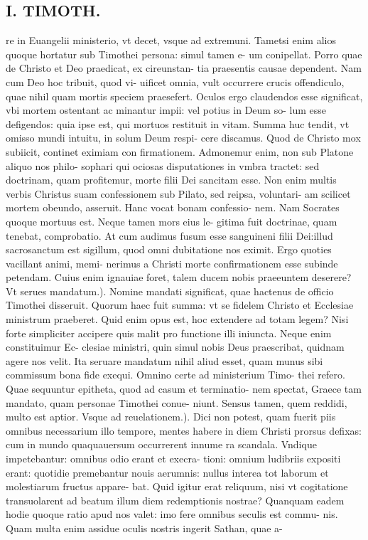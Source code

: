 \documentclass{article}
\begin{document}
\begin{pages}
\section*{I. TIMOTH. }
\marginpar{[ p.80 ]}\pstart re in Euangelii ministerio, vt decet, vsque ad extremuni. Tametsi enim alios quoque hortatur sub Timothei persona: simul tamen e- um conipellat. Porro quae de Christo et Deo praedicat, ex cireunstan- tia praesentis causae dependent. Nam cum Deo hoc tribuit, quod vi- uificet omnia, vult occurrere crucis offendiculo, quae nihil quam mortis speciem praesefert. Oculos ergo claudendos esse significat, vbi mortem ostentant ac minantur impii: vel potius in Deum so- lum esse defigendos: quia ipse est, qui mortuos restituit in vitam. Summa huc tendit, vt omisso mundi intuitu, in solum Deum respi- cere discamus. Quod de Christo mox subiicit, continet eximiam con firmationem. Admonemur enim, non sub Platone aliquo nos philo- sophari qui ociosas disputationes in vmbra tractet: sed doctrinam, quam profitemur, morte filii Dei sancitam esse. Non enim multis verbis Christus suam confessionem sub Pilato, sed reipsa, voluntari- am scilicet mortem obeundo, asseruit. Hanc vocat bonam confessio- nem. Nam Socrates quoque mortuus est. Neque tamen mors eius le- gitima fuit doctrinae, quam tenebat, comprobatio. At cum audimus fusum esse sanguineni filii Dei:illud sacrosanctum est sigillum, quod omni dubitatione nos eximit. Ergo quoties vacillant animi, memi- nerimus a Christi morte confirmationem esse subinde petendam. Cuius enim ignauiae foret, talem ducem nobis praeeuntem deserere?  \pend\pstart Vt serues mandatum.). Nomine mandati significat, quae hactenus de officio Timothei disseruit. Quorum haec fuit summa: vt se fidelem Christo et Ecclesiae ministrum praeberet. Quid enim opus est, hoc extendere ad totam legem? Nisi forte simpliciter accipere quis malit pro functione illi iniuncta. Neque enim constituimur Ec- clesiae ministri, quin simul nobis Deus praescribat, quidnam agere nos velit. Ita seruare mandatum nihil aliud esset, quam munus sibi commissum bona fide exequi. Omnino certe ad ministerium Timo- thei refero. Quae sequuntur epitheta, quod ad casum et terminatio- nem spectat, Graece tam mandato, quam personae Timothei conue- niunt. Sensus tamen, quem reddidi, multo est aptior.  \pend\pstart Vsque ad reuelationem.). Dici non potest, quam fuerit piis omnibus necessarium illo tempore, mentes habere in diem Christi prorsus defixas: cum in mundo quaquauersum occurrerent innume ra scandala. Vndique impetebantur: omnibus odio erant et execra- tioni: omnium ludibriis expositi erant: quotidie premebantur nouis aerumnis: nullus interea tot laborum et molestiarum fructus appare- bat. Quid igitur erat reliquum, nisi vt cogitatione transuolarent ad beatum illum diem redemptionis nostrae? Quanquam eadem hodie quoque ratio apud nos valet: imo fere omnibus seculis est commu- nis. Quam multa enim assidue oculis nostris ingerit Sathan, quae a-  \pend 

\end{pages}
\end{document}
